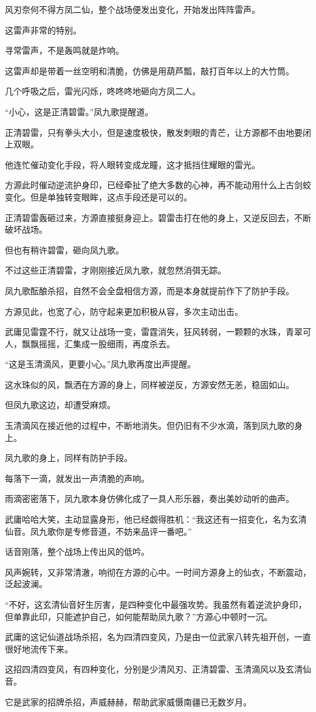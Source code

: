 \begin{this_body}
风刃奈何不得方凤二仙，整个战场便发出变化，开始发出阵阵雷声。

这雷声非常的特别。

寻常雷声，不是轰鸣就是炸响。

这雷声却是带着一丝空明和清脆，仿佛是用葫芦瓢，敲打百年以上的大竹筒。

几个呼吸之后，雷光闪烁，咚咚咚地砸向方凤二人。

“小心，这是正清碧雷。”凤九歌提醒道。

正清碧雷，只有拳头大小，但是速度极快，散发刺眼的青芒，让方源都不由地要闭上双眼。

他连忙催动变化手段，将人眼转变成龙瞳，这才抵挡住耀眼的雷光。

方源此时催动逆流护身印，已经牵扯了绝大多数的心神，再不能动用什么上古剑蛟变化。但是单独转变眼眸，这点手段还是可以的。

正清碧雷轰砸过来，方源直接挺身迎上。碧雷击打在他的身上，又逆反回去，不断破坏战场。

但也有稍许碧雷，砸向凤九歌。

不过这些正清碧雷，才刚刚接近凤九歌，就忽然消弭无踪。

凤九歌酝酿杀招，自然不会全盘相信方源，而是本身就提前作下了防护手段。

方源见此，也宽了心，防守起来更加积极从容，多次主动出击。

武庸见雷霆不行，就又让战场一变，雷霆消失，狂风转弱，一颗颗的水珠，青翠可人，飘飘摇摇，汇集成一股细雨，再度杀去。

“这是玉清滴风，更要小心。”凤九歌再度出声提醒。

这水珠似的风，飘洒在方源的身上，同样被逆反，方源安然无恙，稳固如山。

但凤九歌这边，却遭受麻烦。

玉清滴风在接近他的过程中，不断地消失。但仍旧有不少水滴，落到凤九歌的身上。

凤九歌的身上，同样有防护手段。

每落下一滴，就发出一声清脆的声响。

雨滴密密落下，凤九歌本身仿佛化成了一具人形乐器，奏出美妙动听的曲声。

武庸哈哈大笑，主动显露身形，他已经觑得胜机：“我这还有一招变化，名为玄清仙音。凤九歌你是专修音道，不妨来品评一番吧。”

话音刚落，整个战场上传出风的低吟。

风声婉转，又非常清澈，响彻在方源的心中。一时间方源身上的仙衣，不断震动，泛起波澜。

“不好，这玄清仙音好生厉害，是四种变化中最强攻势。我虽然有着逆流护身印，但单靠此印，只能遮护自己，如何能帮助凤九歌？”方源心中顿时一沉。

武庸的这记仙道战场杀招，名为四清四变风，乃是由一位武家八转先祖开创，一直很好地流传下来。

这招四清四变风，有四种变化，分别是少清风刃、正清碧雷、玉清滴风以及玄清仙音。

它是武家的招牌杀招，声威赫赫，帮助武家威慑南疆已无数岁月。

\end{this_body}

